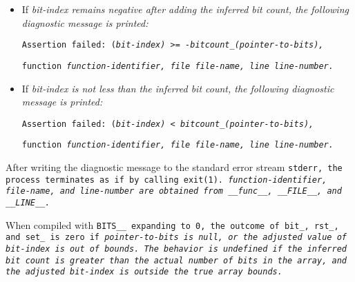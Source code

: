\begin{itemize}[nosep]

\item If \it{bit-index} remains negative after adding the inferred bit count,
the following diagnostic message is printed:

\begin{center}
\tt{Assertion failed: (}\it{bit-index}\tt{) >= -bitcount_(}\it{pointer-to-bits}\tt{),}

\tt{function} \it{function-identifier}\tt{,}
\tt{file} \it{file-name}\tt{,}
\tt{line} \it{line-number}\tt{.}
\end{center}

\item If \it{bit-index} is not less than the inferred bit count,
the following diagnostic message is printed:

\begin{center}
\tt{Assertion failed: (}\it{bit-index}\tt{) < bitcount_(}\it{pointer-to-bits}\tt{),}

\tt{function} \it{function-identifier}\tt{,}
\tt{file} \it{file-name}\tt{,}
\tt{line} \it{line-number}\tt{.}
\end{center}

\end{itemize}

After writing the diagnostic message to the standard error stream \tt{stderr},
the process terminates as if by calling \tt{exit(1)}.
\it{function-identifier}, \it{file-name}, and \it{line-number}
are obtained from \tt{__func__}, \tt{__FILE__}, and \tt{__LINE__}.

When compiled with \tt{BITS__} expanding to \tt{0}, the outcome of
\tt{bit_}, \tt{rst_}, and \tt{set_} is zero if \it{pointer-to-bits}
is null, or the adjusted value of \it{bit-index} is out of bounds.
The behavior is undefined if the inferred bit count
is greater than the actual number of bits in the array,
and the adjusted \it{bit-index} is outside the true array bounds.
